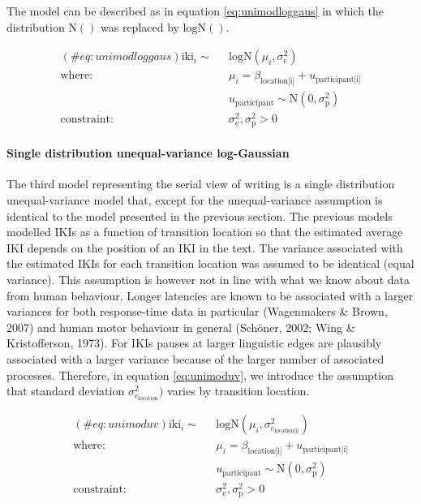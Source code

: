 \begin{appendix}
The model can be described as in equation \ref{eq:unimodloggaus} in
which the distribution \(\text{N}()\) was replaced by \(\text{logN}()\).

\begin{equation}
\begin{aligned}
(\#eq:unimodloggaus)
\text{iki}_i \sim\text{ } & \text{logN}(\mu_i, \sigma_\text{e}^2) \\
\text{where: } &
\mu_i = \beta_\text{location[i]} + u_\text{participant[i]}\\
& u_\text{participant} \sim \text{N}(0, \sigma_\text{p}^2) \\
\text{constraint: } & \sigma_\text{e}^2, \sigma_\text{p}^2>0
\end{aligned}
\end{equation}

\hypertarget{single-distribution-unequal-variance-log-gaussian}{%
\paragraph{Single distribution unequal-variance
log-Gaussian}\label{single-distribution-unequal-variance-log-gaussian}}

The third model representing the serial view of writing is a single
distribution unequal-variance model that, except for the
unequal-variance assumption is identical to the model presented in the
previous section. The previous models modelled IKIs as a function of
transition location so that the estimated average IKI depends on the
position of an IKI in the text. The variance associated with the
estimated IKIs for each transition location was assumed to be identical
(equal variance). This assumption is however not in line with what we
know about data from human behaviour. Longer latencies are known to be
associated with a larger variances for both response-time data in
particular (Wagenmakers \& Brown, 2007) and human motor behaviour in
general (Schöner, 2002; Wing \& Kristofferson, 1973). For IKIs pauses at
larger linguistic edges are plausibly associated with a larger variance
because of the larger number of associated processes. Therefore, in
equation \ref{eq:unimoduv}, we introduce the assumption that standard
deviation \(\sigma_{e_\text{location}}^2)\) varies by transition
location.

\begin{equation}
\begin{aligned}
(\#eq:unimoduv)
\text{iki}_i \sim\text{ } & \text{logN}(\mu_i, \sigma_{e_\text{location[i]}}^2) \\
\text{where: } & \mu_i = \beta_\text{location[i]} + u_\text{participant[i]}\\
 & u_\text{participant} \sim \text{N}(0, \sigma_\text{p}^2) \\
 \text{constraint: } & \sigma_\text{e}^2, \sigma_\text{p}^2>0
\end{aligned}
\end{equation}


\end{appendix}
